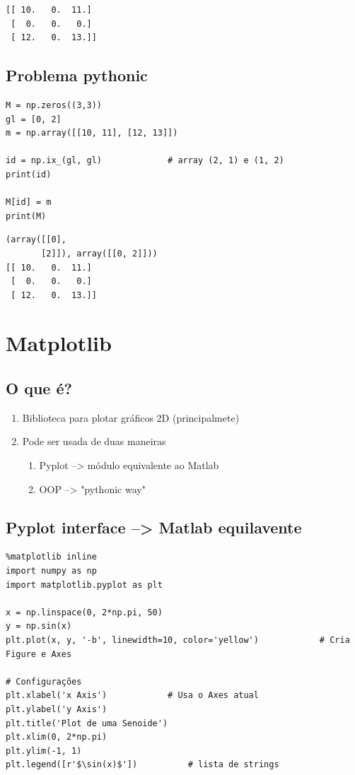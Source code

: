 \documentclass[presentation]{beamer}
\begin{document}
\begin{verbatim}
[[ 10.   0.  11.]
 [  0.   0.   0.]
 [ 12.   0.  13.]]
\end{verbatim}

\subsection{Problema pythonic}
\label{sec:orgheadline25}

\begin{verbatim}
M = np.zeros((3,3))
gl = [0, 2]
m = np.array([[10, 11], [12, 13]])

id = np.ix_(gl, gl)             # array (2, 1) e (1, 2)
print(id)

M[id] = m
print(M)
\end{verbatim}

\begin{verbatim}
(array([[0],
       [2]]), array([[0, 2]]))
[[ 10.   0.  11.]
 [  0.   0.   0.]
 [ 12.   0.  13.]]
\end{verbatim}


\section{Matplotlib}
\label{sec:orgheadline41}
\subsection{O que é?}
\label{sec:orgheadline27}

\begin{enumerate}
\item Biblioteca para plotar gráficos 2D (principalmete)
\item Pode ser usada de duas maneiras
\begin{enumerate}
\item Pyplot --> módulo equivalente ao Matlab
\item OOP --> "pythonic way"
\end{enumerate}
\end{enumerate}

\subsection{Pyplot interface --> Matlab equilavente}
\label{sec:orgheadline28}

\begin{verbatim}
%matplotlib inline
import numpy as np
import matplotlib.pyplot as plt

x = np.linspace(0, 2*np.pi, 50)
y = np.sin(x)
plt.plot(x, y, '-b', linewidth=10, color='yellow')            # Cria Figure e Axes

# Configurações
plt.xlabel('x Axis')            # Usa o Axes atual
plt.ylabel('y Axis')
plt.title('Plot de uma Senoide')
plt.xlim(0, 2*np.pi)
plt.ylim(-1, 1)
plt.legend([r'$\sin(x)$'])          # lista de strings
\end{verbatim}
\end{document}
